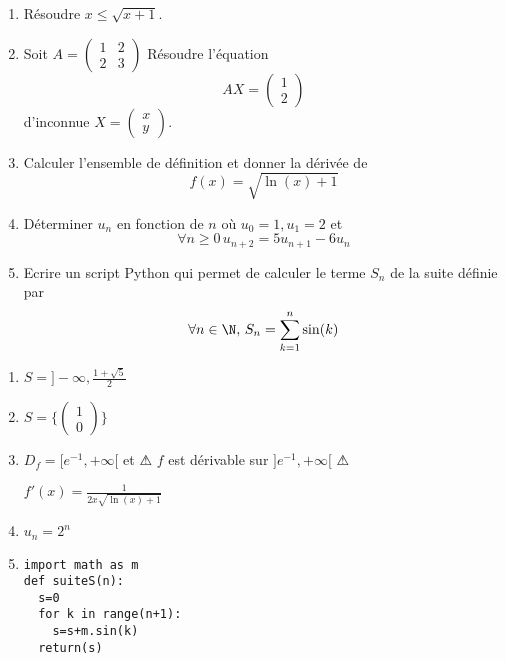 \documentclass[a4paper, 11pt,reqno]{article}
\begin{document}
\begin{enumerate}
\item Résoudre $x\leq \sqrt{x+1}$.
\item Soit $A=\begin{pmatrix}
1 & 2\\
2 & 3
\end{pmatrix}$ Résoudre l'équation
$$
AX=\begin{pmatrix}
1\\
2
\end{pmatrix}$$
 d'inconnue $X=\begin{pmatrix}
x\\y
\end{pmatrix}$.
\item Calculer l'ensemble de définition et donner la dérivée de $$f(x) =\sqrt{ \ln(x) +1}$$
\item Déterminer $u_n$ en fonction de $n$ où $u_0=1, u_1=2$ et 
$$\forall n \geq 0\, u_{n+2} =5u_{n+1}-6u_n$$
\item Ecrire un script Python qui permet de calculer le terme $S_n$ de la suite définie par 
$$\forall n \in \N, \, S_{n} = \sum_{k=1}^n\sin(k)$$
\end{enumerate}

\begin{correction}
\begin{enumerate}
\item $S= ]-\infty , \frac{1+\sqrt{5}}{2}$
\item $S=\{ \begin{pmatrix}
1\\0
\end{pmatrix}\} $
\item $D_f =[e^{-1}, +\infty[$ et $\warning$ $f$ est dérivable sur $]e^{-1}, +\infty [$ $\warning$

$f'(x)= \frac{1}{2x\sqrt{\ln(x)+1} }$
\item $u_n=2^n$
\item \begin{lstlisting}
import math as m
def suiteS(n):
  s=0
  for k in range(n+1):
    s=s+m.sin(k)
  return(s)
\end{lstlisting}
\end{enumerate}
\end{correction}
 
\end{document}
